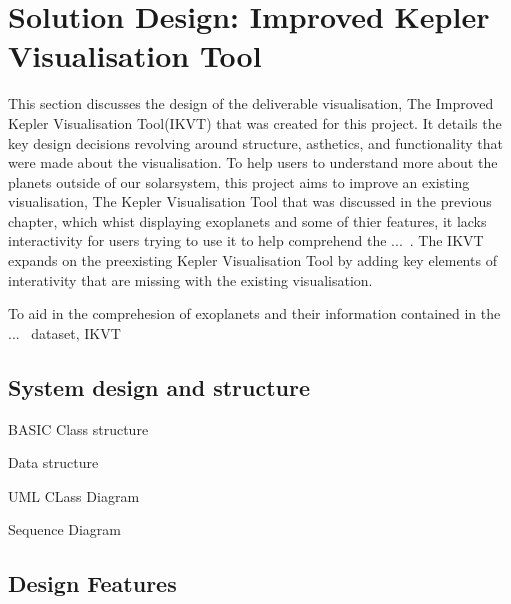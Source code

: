 \chapter{Solution Design: Improved Kepler Visualisation Tool}\label{C:sd}

This section discusses the design of the deliverable visualisation, The Improved Kepler Visualisation Tool(IKVT) that was created for this project. It details the key design decisions revolving around structure, asthetics, and functionality that were made about the visualisation. 
To help users to understand more about the planets outside of our solarsystem, this project aims to improve an existing visualisation, The Kepler Visualisation Tool that was discussed in the previous chapter, which whist displaying exoplanets and some of thier features, it lacks interactivity for users trying to use it to help comprehend the ...~. The IKVT expands on the preexisting Kepler Visualisation Tool by adding key elements of interativity that are missing with the existing visualisation.

To aid in the comprehesion of exoplanets and their information contained in the ...~ dataset, IKVT 





\section{System design and structure}
BASIC Class structure

Data structure

UML CLass Diagram

Sequence Diagram

\section{Design Features}
